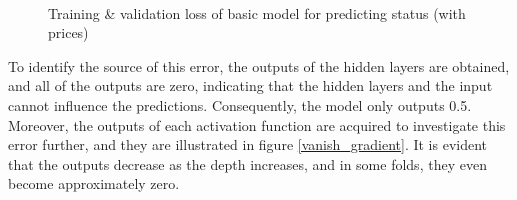 \documentclass[12pt,twoside]{report}
\begin{document}
\begin{figure}[h]
	\centering
	\hfill
	\hfill
	\\
	\hfil
	\caption{Training \& validation loss of basic model for predicting status (with prices)}
	\label{basic_status}
\end{figure}

To identify the source of this error, the outputs of the hidden layers are obtained, and all of the outputs are zero, indicating that the hidden layers and the input cannot influence the predictions. Consequently, the model only outputs 0.5. Moreover, the outputs of each activation function are acquired to investigate this error further, and they are illustrated in figure \ref{vanish_gradient}. It is evident that the outputs decrease as the depth increases, and in some folds, they even become approximately zero.
\\
\end{document}

